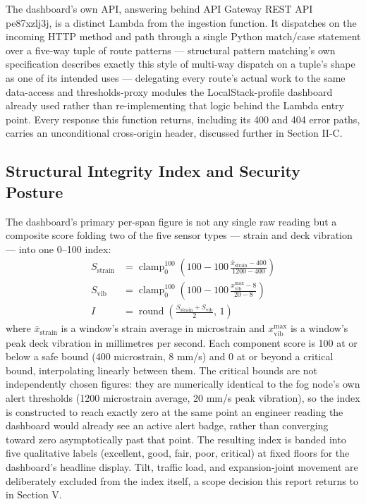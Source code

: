 \documentclass[conference]{IEEEtran}
\begin{document}
The dashboard's own API, answering behind API Gateway REST API pe87xzlj3j, is a distinct Lambda from the ingestion function. It dispatches on the incoming HTTP method and path through a single Python match/case statement over a five-way tuple of route patterns --- structural pattern matching's own specification describes exactly this style of multi-way dispatch on a tuple's shape as one of its intended uses \cite{ref11} --- delegating every route's actual work to the same data-access and thresholds-proxy modules the LocalStack-profile dashboard already used rather than re-implementing that logic behind the Lambda entry point. Every response this function returns, including its 400 and 404 error paths, carries an unconditional cross-origin header, discussed further in Section II-C.

\subsection{Structural Integrity Index and Security Posture}

The dashboard's primary per-span figure is not any single raw reading but a composite score folding two of the five sensor types --- strain and deck vibration --- into one 0--100 index:
\begin{align}
S_{\text{strain}} &= \operatorname{clamp}_{0}^{100}\!\left(100 - 100\,\frac{\bar{x}_{\text{strain}} - 400}{1200 - 400}\right) \\
S_{\text{vib}} &= \operatorname{clamp}_{0}^{100}\!\left(100 - 100\,\frac{x^{\max}_{\text{vib}} - 8}{20 - 8}\right) \\
I &= \operatorname{round}\!\left(\frac{S_{\text{strain}} + S_{\text{vib}}}{2},\,1\right)
\end{align}
where $\bar{x}_{\text{strain}}$ is a window's strain average in microstrain and $x^{\max}_{\text{vib}}$ is a window's peak deck vibration in millimetres per second. Each component score is 100 at or below a safe bound (400 microstrain, 8 mm/s) and 0 at or beyond a critical bound, interpolating linearly between them. The critical bounds are not independently chosen figures: they are numerically identical to the fog node's own alert thresholds (1200 microstrain average, 20 mm/s peak vibration), so the index is constructed to reach exactly zero at the same point an engineer reading the dashboard would already see an active alert badge, rather than converging toward zero asymptotically past that point. The resulting index is banded into five qualitative labels (excellent, good, fair, poor, critical) at fixed floors for the dashboard's headline display. Tilt, traffic load, and expansion-joint movement are deliberately excluded from the index itself, a scope decision this report returns to in Section V.
\end{document}

